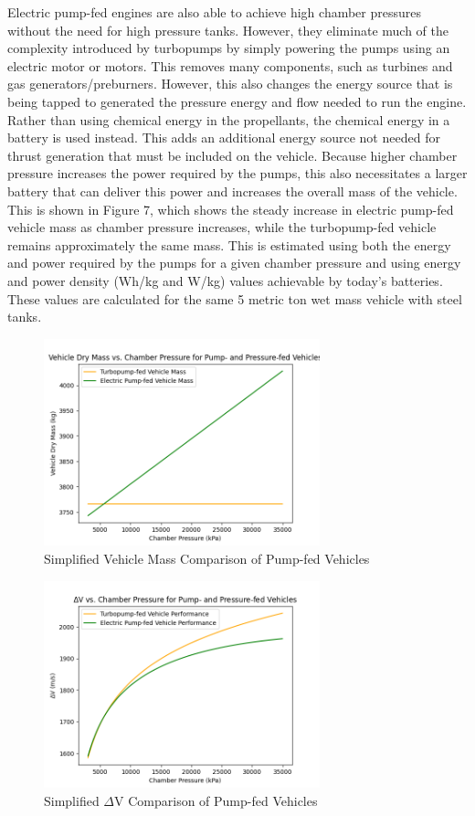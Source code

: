 \documentclass[12pt, letterpaper]{article}
\begin{document}
Electric pump-fed engines are also able to achieve high chamber pressures without the need for high pressure tanks. However, they eliminate much of the complexity introduced by turbopumps by simply powering the pumps using an electric motor or motors. This removes many components, such as turbines and gas generators/preburners. However, this also changes the energy source that is being tapped to generated the pressure energy and flow needed to run the engine. Rather than using chemical energy in the propellants, the chemical energy in a battery is used instead. This adds an additional energy source not needed for thrust generation that must be included on the vehicle. Because higher chamber pressure increases the power required by the pumps, this also necessitates a larger battery that can deliver this power and increases the overall mass of the vehicle. This is shown in Figure 7, which shows the steady increase in electric pump-fed vehicle mass as chamber pressure increases, while the turbopump-fed vehicle remains approximately the same mass. This is estimated using both the energy and power required by the pumps for a given chamber pressure and using energy and power density (Wh/kg and W/kg) values achievable by today's batteries. These values are calculated for the same 5 metric ton wet mass vehicle with steel tanks.

\begin{figure}[]
    \centering
    \includegraphics[width=8cm]{VehicleMass_V_Pc_Pump_Only.png}
    \caption{Simplified Vehicle Mass Comparison of Pump-fed Vehicles}
\end{figure}

\begin{figure}[]
    \centering
    \includegraphics[width=8cm]{deltaV_V_Pc_Pump_Only.png}
    \caption{Simplified $\Delta$V Comparison of Pump-fed Vehicles}
\end{figure}
\end{document}
